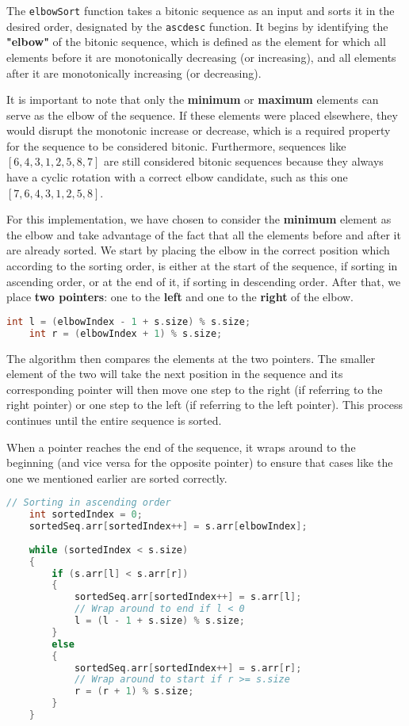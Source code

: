\documentclass[12pt]{article}
\begin{document}
The \texttt{elbowSort} function takes a bitonic sequence as an input and sorts it in the desired order, designated by the \texttt{ascdesc} function. It begins by identifying the \textbf{"elbow"} of the bitonic sequence, which is defined as the element for which all elements before it are monotonically decreasing (or increasing), and all elements after it are monotonically increasing (or decreasing). 

It is important to note that only the \textbf{minimum} or \textbf{maximum} elements can serve as the elbow of the sequence. If these elements were placed elsewhere, they would disrupt the monotonic increase or decrease, which is a required property for the sequence to be considered bitonic. Furthermore, sequences like \([6, 4, 3, 1, 2, 5, 8, 7]\) are still considered bitonic sequences because they always have a cyclic rotation with a correct elbow candidate, such as this one \([7, 6, 4, 3, 1, 2, 5, 8]\).

For this implementation, we have chosen to consider the \textbf{minimum} element as the elbow and take advantage of the fact that all the elements before and after it are already sorted. We start by placing the elbow in the correct position which according to the sorting order, is either at the start of the sequence, if sorting in ascending order, or at the end of it, if sorting in descending order. After that, we place \textbf{two pointers}: one to the \textbf{left} and one to the \textbf{right} of the elbow.
\vspace{0.3cm}
\begin{lstlisting}[language=C]
    int l = (elbowIndex - 1 + s.size) % s.size;
    int r = (elbowIndex + 1) % s.size;
\end{lstlisting}
\vspace{0.3cm}
The algorithm then compares the elements at the two pointers. The smaller element of the two will take the next position in the sequence and its corresponding pointer will then move one step to the right (if referring to the right pointer) or one step to the left (if referring to the left pointer). This process continues until the entire sequence is sorted.

When a pointer reaches the end of the sequence, it wraps around to the beginning (and vice versa for the opposite pointer) to ensure that cases like the one we mentioned earlier are sorted correctly.

\vspace{0.3cm}
    \begin{lstlisting}[language=C]
    // Sorting in ascending order
    int sortedIndex = 0;
    sortedSeq.arr[sortedIndex++] = s.arr[elbowIndex];
    
    while (sortedIndex < s.size)
    {
        if (s.arr[l] < s.arr[r])
        {
            sortedSeq.arr[sortedIndex++] = s.arr[l];
            // Wrap around to end if l < 0
            l = (l - 1 + s.size) % s.size;
        }
        else
        {
            sortedSeq.arr[sortedIndex++] = s.arr[r];
            // Wrap around to start if r >= s.size
            r = (r + 1) % s.size;
        }
    }
\end{lstlisting}
\newpage
\end{document}
